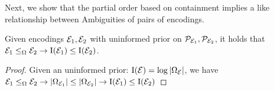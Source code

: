 
 Next, we show that the partial order based on containment implies a like relationship between Ambiguities of pairs of encodings.
\begin{lemma}
\label{prop:containmentrepresentativeness}
Given encodings $\mathcal E_1,\mathcal E_2$ with uninformed prior on $\mathcal{P}_{\mathcal E_1},\mathcal{P}_{\mathcal E_2}$, it holds that $\mathcal E_1 \leq_\Omega \mathcal E_2\to \text{I}(\mathcal E_1)\leq \text{I}(\mathcal E_2)$.
\end{lemma}
\begin{proof}
Given an uninformed prior: $\text{I}(\mathcal E)=\log|\Omega_\mathcal E|$, we have $\mathcal E_1 \leq_\Omega \mathcal E_2\to|\Omega_{\mathcal E_1}|\leq|\Omega_{\mathcal E_2}|\to \text{I}(\mathcal E_1)\leq \text{I}(\mathcal E_2)$ 
\end{proof}

